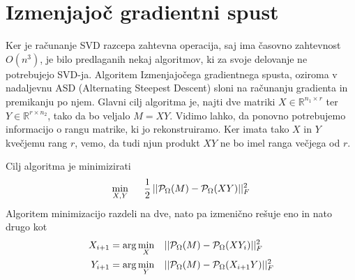 \section{Izmenjajoč gradientni spust}
Ker je računanje SVD razcepa zahtevna operacija, saj ima časovno zahtevnost
$O(n^3)$, je bilo predlaganih nekaj algoritmov, ki za svoje delovanje ne potrebujejo SVD-ja. Algoritem Izmenjajočega gradientnega spusta, oziroma v nadaljevnu ASD (Alternating Steepest Descent) sloni na računanju gradienta in premikanju po njem. Glavni cilj algoritma je, najti dve matriki $X \in \mathbb{R}^{n_1 \times r}$ ter $Y \in \mathbb{R}^{r \times n_2}$, tako da bo veljalo $M = XY$. Vidimo lahko, da ponovno potrebujemo informacijo o rangu matrike, ki jo rekonstruiramo. Ker imata tako $X$ in $Y$ kvečjemu rang $r$, vemo, da tudi njun produkt $XY$ ne bo imel ranga večjega od $r$. 

Cilj algoritma je minimizirati 
\[
    \min_{X, Y} \hspace{0.5cm} \frac{1}{2}\, ||\mathcal{P}_\Omega(M) - \mathcal{P}_\Omega(XY)||^2_F
\] 
Algoritem minimizacijo razdeli na dve, nato pa izmenično rešuje eno in nato drugo kot 
\begin{align*}
    X_{i+1} &= \arg \min_{X} \hspace{0.3cm} ||\mathcal{P}_\Omega(M) - \mathcal{P}_\Omega(XY_i)||^2_F \\
    Y_{i+1} &= \arg \min_{Y} \hspace{0.3cm} ||\mathcal{P}_\Omega(M) - \mathcal{P}_\Omega(X_{i+1}Y)||^2_F
\end{align*}
\cite{AST-TK15}

